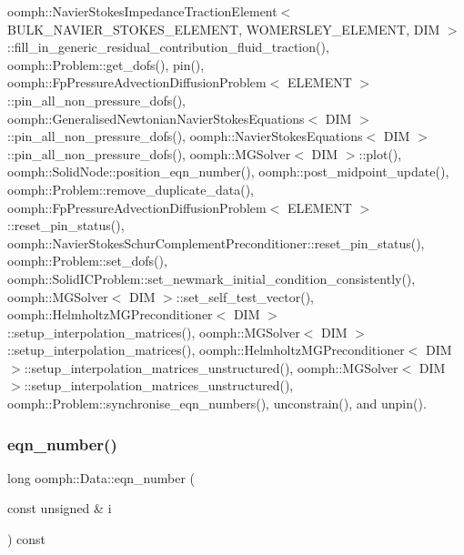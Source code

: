 oomph\+::\+Navier\+Stokes\+Impedance\+Traction\+Element$<$ B\+U\+L\+K\+\_\+\+N\+A\+V\+I\+E\+R\+\_\+\+S\+T\+O\+K\+E\+S\+\_\+\+E\+L\+E\+M\+E\+N\+T, W\+O\+M\+E\+R\+S\+L\+E\+Y\+\_\+\+E\+L\+E\+M\+E\+N\+T, D\+I\+M $>$\+::fill\+\_\+in\+\_\+generic\+\_\+residual\+\_\+contribution\+\_\+fluid\+\_\+traction(), oomph\+::\+Problem\+::get\+\_\+dofs(), pin(), oomph\+::\+Fp\+Pressure\+Advection\+Diffusion\+Problem$<$ E\+L\+E\+M\+E\+N\+T $>$\+::pin\+\_\+all\+\_\+non\+\_\+pressure\+\_\+dofs(), oomph\+::\+Generalised\+Newtonian\+Navier\+Stokes\+Equations$<$ D\+I\+M $>$\+::pin\+\_\+all\+\_\+non\+\_\+pressure\+\_\+dofs(), oomph\+::\+Navier\+Stokes\+Equations$<$ D\+I\+M $>$\+::pin\+\_\+all\+\_\+non\+\_\+pressure\+\_\+dofs(), oomph\+::\+M\+G\+Solver$<$ D\+I\+M $>$\+::plot(), oomph\+::\+Solid\+Node\+::position\+\_\+eqn\+\_\+number(), oomph\+::post\+\_\+midpoint\+\_\+update(), oomph\+::\+Problem\+::remove\+\_\+duplicate\+\_\+data(), oomph\+::\+Fp\+Pressure\+Advection\+Diffusion\+Problem$<$ E\+L\+E\+M\+E\+N\+T $>$\+::reset\+\_\+pin\+\_\+status(), oomph\+::\+Navier\+Stokes\+Schur\+Complement\+Preconditioner\+::reset\+\_\+pin\+\_\+status(), oomph\+::\+Problem\+::set\+\_\+dofs(), oomph\+::\+Solid\+I\+C\+Problem\+::set\+\_\+newmark\+\_\+initial\+\_\+condition\+\_\+consistently(), oomph\+::\+M\+G\+Solver$<$ D\+I\+M $>$\+::set\+\_\+self\+\_\+test\+\_\+vector(), oomph\+::\+Helmholtz\+M\+G\+Preconditioner$<$ D\+I\+M $>$\+::setup\+\_\+interpolation\+\_\+matrices(), oomph\+::\+M\+G\+Solver$<$ D\+I\+M $>$\+::setup\+\_\+interpolation\+\_\+matrices(), oomph\+::\+Helmholtz\+M\+G\+Preconditioner$<$ D\+I\+M $>$\+::setup\+\_\+interpolation\+\_\+matrices\+\_\+unstructured(), oomph\+::\+M\+G\+Solver$<$ D\+I\+M $>$\+::setup\+\_\+interpolation\+\_\+matrices\+\_\+unstructured(), oomph\+::\+Problem\+::synchronise\+\_\+eqn\+\_\+numbers(), unconstrain(), and unpin().

\mbox{\label{classoomph_1_1Data_a0181614ab39e3b02d28acba40bb33cb2}} 
\subsubsection{\texorpdfstring{eqn\+\_\+number()}{eqn\_number()}\hspace{0.1cm}{\footnotesize\ttfamily [2/2]}}
{\footnotesize\ttfamily long oomph\+::\+Data\+::eqn\+\_\+number (\begin{DoxyParamCaption}\item[{const unsigned \&}]{i }\end{DoxyParamCaption}) const\hspace{0.3cm}{\ttfamily [inline]}}



